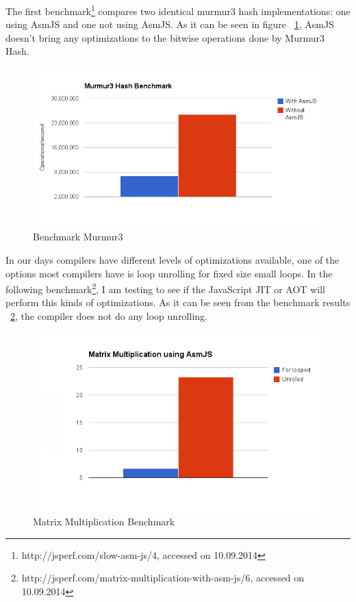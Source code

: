 The first benchmark\footnote{http://jsperf.com/slow-asm-js/4, accessed on 10.09.2014} compares two identical murmur3 hash implementations: one using AsmJS and one not using AsmJS. 
As it can be seen in figure ~\ref{img:murmur3}, AsmJS doesn't bring any optimizations to the bitwise operations done by Murmur3 Hash.
\begin{center}
	\begin{figure}[here!]
		\includegraphics[width=\textwidth]{src/img/murmur3.png}
		\caption{Benchmark Murmur3}
		\label{img:murmur3}
	\end{figure}
\end{center}
In our days compilers have different levels of optimizations available, one of the options most compilers have is loop unrolling for fixed size small loops. In the following benchmark\footnote{http://jsperf.com/matrix-multiplication-with-asm-js/6, accessed on 10.09.2014}, I am testing to see if the JavaScript JIT or AOT will perform this kinds of optimizations.
As it can be seen from the benchmark results ~\ref{img:matrix-mul}, the compiler does not do any loop unrolling.
\begin{center}
	\begin{figure}[here!]
		\includegraphics[width=\textwidth]{src/img/matrix-mult.png}
		\caption{Matrix Multiplication Benchmark}
		\label{img:matrix-mul}
	\end{figure}
\end{center}

